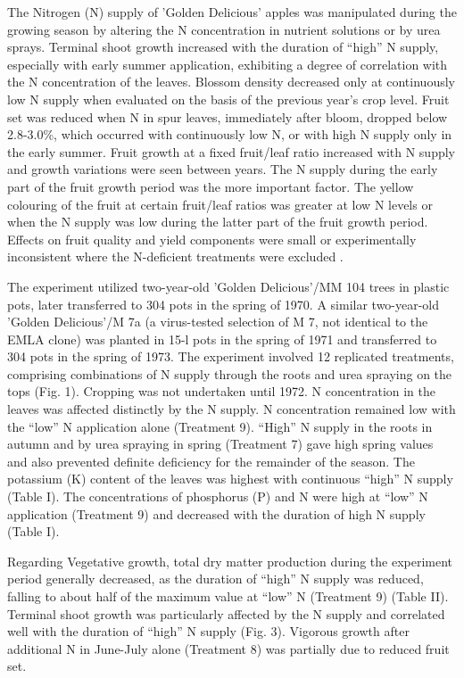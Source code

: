 The Nitrogen (N) supply of 'Golden Delicious' apples was manipulated during the growing season by altering the N concentration in nutrient solutions or by urea sprays. Terminal shoot growth increased with the duration of “high” N supply, especially with early summer application, exhibiting a degree of correlation with the N concentration of the leaves. Blossom density decreased only at continuously low N supply when evaluated on the basis of the previous year's crop level. Fruit set was reduced when N in spur leaves, immediately after bloom, dropped below 2.8-3.0\%, which occurred with continuously low N, or with high N supply only in the early summer. Fruit growth at a fixed fruit/leaf ratio increased with N supply and growth variations were seen between years. The N supply during the early part of the fruit growth period was the more important factor. The yellow colouring of the fruit at certain fruit/leaf ratios was greater at low N levels or when the N supply was low during the latter part of the fruit growth period. Effects on fruit quality and yield components were small or experimentally inconsistent where the N-deficient treatments were excluded \cite*{RM_13_L24_25_nitrogen_supply_apple_yield}.

\vspace{0.5em}
The experiment utilized two-year-old 'Golden Delicious'/MM 104 trees in plastic pots, later transferred to 304 pots in the spring of 1970. A similar two-year-old 'Golden Delicious'/M 7a (a virus-tested selection of M 7, not identical to the EMLA clone) was planted in 15-l pots in the spring of 1971 and transferred to 304 pots in the spring of 1973. The experiment involved 12 replicated treatments, comprising combinations of N supply through the roots and urea spraying on the tops (Fig. 1). Cropping was not undertaken until 1972. N concentration in the leaves was affected distinctly by the N supply. N concentration remained low with the “low” N application alone (Treatment 9). “High” N supply in the roots in autumn and by urea spraying in spring (Treatment 7) gave high spring values and also prevented definite deficiency for the remainder of the season. The potassium (K) content of the leaves was highest with continuous “high” N supply (Table I). The concentrations of phosphorus (P) and N were high at “low” N application (Treatment 9) and decreased with the duration of high N supply (Table I).

\vspace{0.5em}
Regarding Vegetative growth, total dry matter production during the experiment period generally decreased, as the duration of “high” N supply was reduced, falling to about half of the maximum value at “low” N (Treatment 9) (Table II). Terminal shoot growth was particularly affected by the N supply and correlated well with the duration of “high” N supply (Fig. 3). Vigorous growth after additional N in June-July alone (Treatment 8) was partially due to reduced fruit set.

